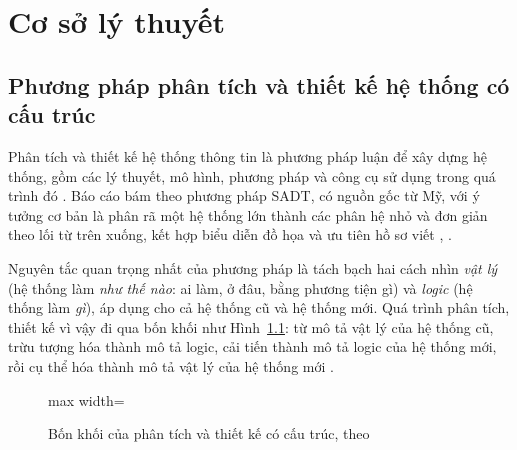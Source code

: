 \chapter{Cơ sở lý thuyết}
\label{ch:cosolythuyet}

\section{Phương pháp phân tích và thiết kế hệ thống có cấu trúc}
\label{sec:sadt}

Phân tích và thiết kế hệ thống thông tin là phương pháp luận để xây dựng hệ thống, gồm các lý thuyết, mô hình, phương pháp và công cụ sử dụng trong quá trình đó \cite[Ch.~1]{tung_qlhttt}. Báo cáo bám theo phương pháp SADT, có nguồn gốc từ Mỹ, với ý tưởng cơ bản là phân rã một hệ thống lớn thành các phân hệ nhỏ và đơn giản theo lối từ trên xuống, kết hợp biểu diễn đồ họa và ưu tiên hồ sơ viết \cite[Ch.~1]{tung_qlhttt}, \cite{demarco1978}.

Nguyên tắc quan trọng nhất của phương pháp là tách bạch hai cách nhìn \emph{vật lý} (hệ thống làm \emph{như thế nào}: ai làm, ở đâu, bằng phương tiện gì) và \emph{logic} (hệ thống làm \emph{gì}), áp dụng cho cả hệ thống cũ và hệ thống mới. Quá trình phân tích, thiết kế vì vậy đi qua bốn khối như Hình~\ref{fig:bonkhoi}: từ mô tả vật lý của hệ thống cũ, trừu tượng hóa thành mô tả logic, cải tiến thành mô tả logic của hệ thống mới, rồi cụ thể hóa thành mô tả vật lý của hệ thống mới \cite[Ch.~1, Ch.~5]{tung_qlhttt}.

\begin{figure}[H]
\centering
\begin{adjustbox}{max width=\linewidth}
\end{adjustbox}
\caption{Bốn khối của phân tích và thiết kế có cấu trúc, theo \cite{tung_qlhttt}}
\label{fig:bonkhoi}
\end{figure}

